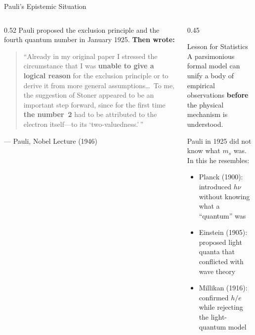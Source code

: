 \documentclass[aspectratio=169,12pt]{beamer}
\begin{document}
\begin{frame}[shrink=20]{Pauli's Epistemic Situation}

\begin{columns}[T]
\begin{column}{0.52\textwidth}
Pauli proposed the exclusion principle and the fourth quantum number in
January 1925.  \textbf{Then wrote:}

\bigskip
\begin{quote}
``Already in my original paper I stressed the circumstance that I was
\textbf{unable to give a logical reason} for the exclusion principle
or to derive it from more general assumptions\ldots\ To me, the
suggestion of Stoner appeared to be an important step forward, since
for the first time \textbf{the number~2} had to be attributed to the
electron itself---to its `two-valuedness.'\,''
\end{quote}
\hfill\small{--- Pauli, Nobel Lecture (1946)}
\end{column}
\begin{column}{0.45\textwidth}
\begin{block}{Lesson for Statistics}
A parsimonious formal model can unify a body of empirical observations
\textbf{before} the physical mechanism is understood.

\bigskip
Pauli in 1925 did not know what $m_s$
was.  In this he resembles:
\begin{itemize}
  \item Planck (1900): introduced $h\nu$
    without knowing what a ``quantum'' was
  \item Einstein (1905): proposed light
    quanta that conflicted with wave theory
  \item Millikan (1916): confirmed $h/e$
    while rejecting the light-quantum model
\end{itemize}
\end{block}
\end{column}
\end{columns}

\end{frame}
\end{document}
